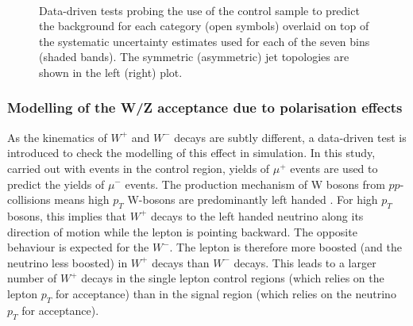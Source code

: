 \begin{figure}[h!]
  \begin{center}
    ~~
    \caption{Data-driven tests probing the use of the \mj control sample
      to predict the \znunu background for each
      \njet category (open symbols) overlaid on top of the systematic
      uncertainty estimates used for each of the seven \scalht bins (shaded bands).  
      The symmetric (asymmetric) jet topologies are shown in the left (right) plot. 
    }
    \label{fig:closureMuToMuMu}
  \end{center} 
\end{figure}

\subsubsection*{Modelling of the W/Z acceptance due to polarisation effects}
\label{sec:tfSyst_Wpol}

As the kinematics of $W^+$ and $W^-$ decays are subtly different, a
data-driven test is introduced to check the modelling of this effect
in simulation. In this study, carried out with events in the \mj
control region, yields of $\mu^{+}$ events are used to predict the yields
of $\mu^{-}$ events.  The production mechanism of W bosons from
$pp$-collisions means high $p_T$ W-bosons are predominantly left
handed \cite{WPol}.  For high $p_T$ bosons, this implies that $W^+$
decays to the left handed neutrino along its direction of motion while
the lepton is pointing backward.  The opposite behaviour is expected
for the $W^-$. The lepton is therefore more boosted (and the neutrino
less boosted) in $W^+$ decays than $W^-$ decays.  This leads to a
larger number of $W^+$ decays in the single lepton control regions
(which relies on the lepton $p_T$ for acceptance) than in the signal
region (which relies on the neutrino $p_T$ for acceptance).


